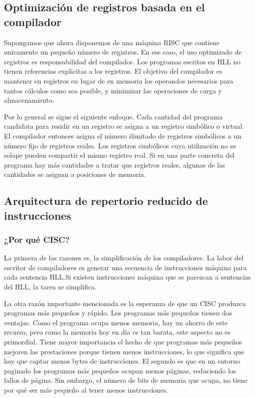 \subsection{Optimización de registros basada en el compilador}

Supongamos que ahora disponemos de una máquina RISC que contiene unicamente un pequeño número de registros. En ese caso, el uso optimizado de registros es responsabilidad del compilador. Los programas escritos en HLL no tienen referencias explicitas a los registros. El objetivo del compilador es mantener en registros en lugar de en memoria los operandos necesarios para tantos cálculos como sea posible, y minimizar las operaciones de carga y almacenamiento.

Por lo general se sigue el siguiente enfoque. Cada cantidad del programa candidata para residir en un registro se asigna a un registro simbólico o virtual. El compilador entonces asigna el número ilimitado de registros simbólicos a un número fijo de registros reales. Los registros simbólicos cuya utilización no se solape pueden compartir el mismo registro real. Si en una parte concreta del programa hay más cantidades a tratar que registros reales, algunas de las cantidades se asignan a posiciones de memoria.

\subsection{Arquitectura de repertorio reducido de instrucciones}

\subsubsection*{¿Por qué CISC?}

La primera de las razones es, la simplificación de los compiladores. La labor del escritor de compiladores es generar una secuencia de instrucciones máquina para cada sentencia HLL.\@ Si existen instrucciones máquina que se parezcan a sentencias del HLL, la tarea se simplifica.

La otra razón importante mencionada es la esperanza de que un CISC produzca programas más pequeños y rápido. Los programas más pequeños tienen dos ventajas. Como el programa ocupa menos memoria, hay un ahorro de este recurso, pero como la memoria hoy en día es tan barata, este aspecto no es primordial. Tiene mayor importancia el hecho de que programas más pequeños mejoren las prestaciones porque tienen menos instrucciones, lo que significa que hay que captar menos bytes de instrucciones. El segundo es que en un entorno paginado los programas más pequeños ocupan menos páginas, reduciendo los fallos de página. Sin embargo, el número de bits de memoria que ocupa, no tiene por qué ser más pequeño al tener menos instrucciones.

